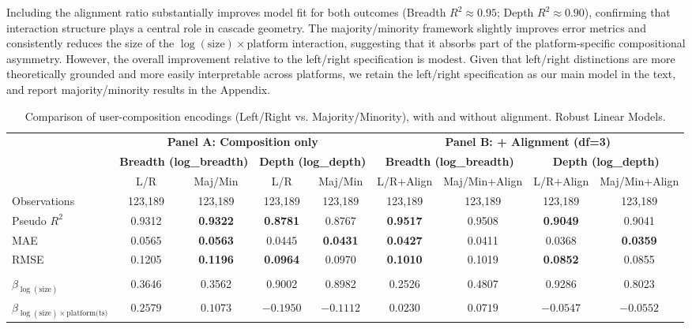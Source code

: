 \documentclass[letterpaper]{article} %
\begin{document}
Including the alignment ratio substantially improves model fit for both outcomes (Breadth $R^2 \approx 0.95$; Depth $R^2 \approx 0.90$), confirming that interaction structure plays a central role in cascade geometry. The majority/minority framework slightly improves error metrics and consistently reduces the size of the $\log(\text{size}) \times \text{platform}$ interaction, suggesting that it absorbs part of the platform-specific compositional asymmetry. However, the overall improvement relative to the left/right specification is modest. Given that left/right distinctions are more theoretically grounded and more easily interpretable across platforms, we retain the left/right specification as our main model in the text, and report majority/minority results in the Appendix.
\begin{table}[t]
\centering
\caption{Comparison of user-composition encodings (Left/Right vs. Majority/Minority), with and without alignment. Robust Linear Models.}
\label{tab:si_comp_encoding_rlm_full}
\scriptsize
\renewcommand{\arraystretch}{1.25}
\setlength{\tabcolsep}{3pt}

\begin{tabular}{lcccccccc}
\hline
& \multicolumn{4}{c}{\textbf{Panel A: Composition only}} & \multicolumn{4}{c}{\textbf{Panel B: + Alignment (df=3)}}\\
\cline{2-9}
& \multicolumn{2}{c}{\textbf{Breadth (log\_breadth)}} & \multicolumn{2}{c}{\textbf{Depth (log\_depth)}} & \multicolumn{2}{c}{\textbf{Breadth (log\_breadth)}} & \multicolumn{2}{c}{\textbf{Depth (log\_depth)}}\\
\cline{2-9} 
& L/R & Maj/Min & L/R & Maj/Min & L/R+Align & Maj/Min+Align & L/R+Align & Maj/Min+Align \\
\hline
Observations & 123{,}189 & 123{,}189 & 123{,}189 & 123{,}189 & 123{,}189 & 123{,}189 & 123{,}189 & 123{,}189 \\
Pseudo $R^{2}$ & 0.9312 & \textbf{0.9322} & \textbf{0.8781} & 0.8767 & \textbf{0.9517} & 0.9508 & \textbf{0.9049} & 0.9041 \\
MAE & 0.0565 & \textbf{0.0563} & 0.0445 & \textbf{0.0431} & \textbf{0.0427} & 0.0411 & 0.0368 & \textbf{0.0359} \\
RMSE & 0.1205 & \textbf{0.1196} & \textbf{0.0964} & 0.0970 & \textbf{0.1010} & 0.1019 & \textbf{0.0852} & 0.0855 \\
\\
$\beta_{\log(\text{size})}$ 
& 0.3646 & 0.3562 & 0.9002 & 0.8982 & 0.2526 & 0.4807 & 0.9286 & 0.8023 \\
$\beta_{\log(\text{size})\times \text{platform(ts)}}$ 
& $0.2579$ & $0.1073$ & $-0.1950$ & $-0.1112$ & $0.0230$ & $0.0719$ & $-0.0547$ & $-0.0552$ \\
\hline
\end{tabular}


\end{table}
\end{document}
